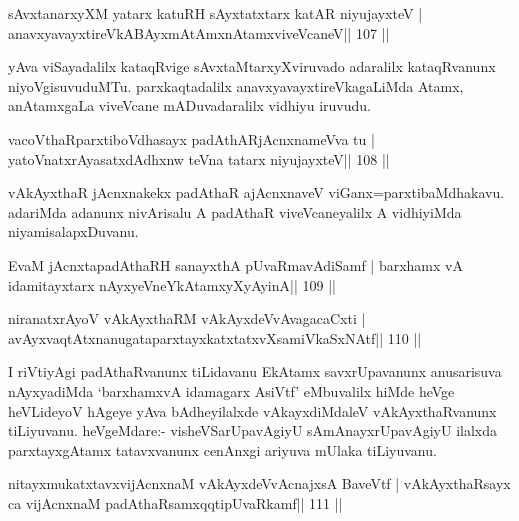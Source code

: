 \begin{shl}
sAvxtanarxyXM yatarx katuRH sAyxtatxtarx katAR niyujayxteV |
\footnotemark[2]anavxyavayxtireVkABAyxmAtAmxnAtamxviveVcaneV\hfill || 107 ||
\end{shl}

\begin{artha}
yAva viSayadalilx kataqRvige sAvxtaMtarxyXviruvado adaralilx
kataqRvanunx niyoVgisuvuduMTu. parxkaqtadalilx
anavxyavayxtireVkagaLiMda Atamx, anAtamxgaLa viveVcane mADuvadaralilx
vidhiyu iruvudu.
\end{artha}


\begin{shl}
vacoVthaRparxtiboVdhasayx padAthARjAcnxnameVva tu |
yatoV\s natxrAyasatxdAdhxnw teVna tatarx niyujayxteV\hfill || 108 ||
\end{shl}

\begin{artha}
vAkAyxthaR jAcnxnakekx padAthaR ajAcnxnaveV viGanx=parxtibaMdhakavu. adariMda adanunx nivArisalu A padAthaR viveVcaneyalilx A vidhiyiMda niyamisalapxDuvanu.
\end{artha}

\begin{shl}
EvaM jAcnxtapadAthaRH sanayxthA pUvaRmavAdiSamf |
barxhamx vA idamitayxtarx nAyxyeVneYkAtamxyXyAyinA\hfill || 109 ||
\end{shl}

\begin{shl}
niranatxrAyoV vAkAyxthaRM vAkAyxdeVvAvagacaCxti |
avAyxvaqtAtxnanugataparxtayxkatxtatxvXsamiVkaSxNAtf\hfill || 110 ||
\end{shl}

\begin{artha}
I riVtiyAgi padAthaRvanunx tiLidavanu EkAtamx savxrUpavanunx anusarisuva nAyxyadiMda `barxhamxvA idamagarx AsiVtf' eMbuvalilx hiMde heVge heVLideyoV hAgeye yAva bAdheyilalxde vAkayxdiMdaleV vAkAyxthaRvanunx tiLiyuvanu. heVgeMdare:- visheVSarUpavAgiyU sAmAnayxrUpavAgiyU ilalxda parxtayxgAtamx tatavxvanunx cenAnxgi ariyuva mUlaka tiLiyuvanu.
\end{artha}


\begin{shl}
nitayxmukatxtavxvijAcnxnaM  \footnotemark[1]vAkAyxdeVvAcnajxsA BaveVtf |
vAkAyxthaRsayx ca vijAcnxnaM padAthaRsamxqqtipUvaRkamf\hfill || 111 ||
\end{shl}

